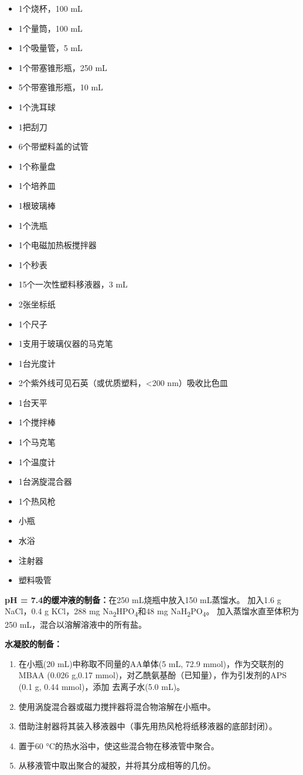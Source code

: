 \begin{itemize}
\tightlist
\item
  1个烧杯，100 mL
\item
  1个量筒，100 mL
\item
  1个吸量管，5 mL
\item
  1个带塞锥形瓶，250 mL
\item
  5个带塞锥形瓶，10 mL
\item
  1个洗耳球
\item
  1把刮刀
\item
  6个带塑料盖的试管
\item
  1个称量盘
\item
  1个培养皿
\item
  1根玻璃棒
\item
  1个洗瓶
\item
  1个电磁加热板搅拌器
\item
  1个秒表
\item
  15个一次性塑料移液器，3 mL
\item
  2张坐标纸
\item
  1个尺子
\item
  1支用于玻璃仪器的马克笔
\item
  1台光度计
\item
  2个紫外线可见石英（或优质塑料，\textless{}200 nm）吸收比色皿
\item
  1台天平
\item
  1个搅拌棒
\item
  1个马克笔
\item
  1个温度计
\item
  1台涡旋混合器
\item
  1个热风枪
\item
  小瓶
\item
  水浴
\item
  注射器
\item
  塑料吸管
\end{itemize}

\textbf{pH = 7.4的缓冲液的制备：}在250 mL烧瓶中放入150 mL蒸馏水。
加入1.6 g NaCl，0.4 g KCl，288 mg
Na\textsubscript{2}HPO\textsubscript{4}和48 mg
NaH\textsubscript{2}PO\textsubscript{4}。 加入蒸馏水直至体积为250
mL，混合以溶解溶液中的所有盐。

\textbf{水凝胶的制备：}

\begin{enumerate}
\tightlist
\item 在小瓶(20 mL)中称取不同量的AA单体(5 mL, 72.9 mmol)，作为交联剂的MBAA
  (0.026 g,0.17 mmol)，对乙酰氨基酚（已知量），作为引发剂的APS (0.1 g,
  0.44 mmol)，添加 去离子水(5.0 mL)。
\item 使用涡旋混合器或磁力搅拌器将混合物溶解在小瓶中。
\item 借助注射器将其装入移液器中（事先用热风枪将纸移液器的底部封闭）。
\item 置于60 °C的热水浴中，使这些混合物在移液管中聚合。
\item 从移液管中取出聚合的凝胶，并将其分成相等的几份。
\end{enumerate}

